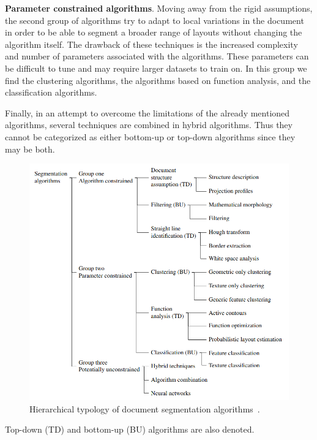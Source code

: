 \documentclass[oneside, english, bibtex]{kththesis}
\begin{document}
\textbf{Parameter constrained algorithms}. Moving away from the rigid assumptions, the second group of algorithms try to adapt to local variations in the document in order to be able to segment a broader range of layouts without changing the algorithm itself. The drawback of these techniques is the increased complexity and number of parameters associated with the algorithms. These parameters can be difficult to tune and may require larger datasets to train on. In this group we find the clustering algorithms, the algorithms based on function analysis, and the classification algorithms.

Finally, in an attempt to overcome the limitations of the already mentioned algorithms, several techniques are combined in hybrid algorithms. Thus they cannot be categorized as either bottom-up or top-down algorithms since they may be both.

\begin{figure}[H]
  \begin{center}
    \includegraphics[width=1.0\textwidth]{figures/classicalalgs.png}
  \end{center}
  \caption{Hierarchical typology of document segmentation algorithms~\cite{ESKENAZI20171}.   }
  \label{fig:classicalgs}
\end{figure}

\begin{center}
Top-down (TD) and bottom-up (BU) algorithms are also denoted.
\end{center}
\end{document}
